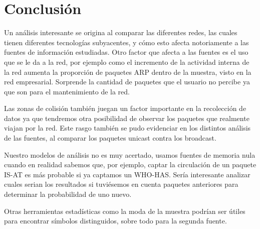 \section{Conclusión}

Un análisis interesante se origina al comparar las diferentes redes, las cuales tienen diferentes tecnologías subyacentes, y cómo esto afecta notoriamente a las fuentes de información estudiadas. Otro factor que afecta a las fuentes es el uso que se le da a la red, por ejemplo como el incremento de la actividad interna de la red aumenta la proporción de paquetes ARP dentro de la muestra, visto en la red empresarial. Sorprende la cantidad de paquetes que el usuario no percibe ya que son para el mantenimiento de la red.

Las zonas de colisión también juegan un factor importante en la recolección de datos ya que tendremos otra posibilidad de observar los paquetes que realmente viajan por la red. Este rasgo también se pudo evidenciar en los distintos análisis de las fuentes, al comparar los paquetes unicast contra los broadcast.

Nuestro modelos de análisis no es muy acertado, usamos fuentes de memoria nula cuando en realidad sabemos que, por ejemplo, captar la circulación de un paquete IS-AT es más probable si ya captamos un WHO-HAS. Sería interesante analizar cuales serian los resultados si tuviésemos en cuenta paquetes anteriores para determinar la probabilidad de uno nuevo.

Otras herramientas estadísticas como la moda de la muestra podrían ser útiles para encontrar símbolos distinguidos, sobre todo para la segunda fuente.

